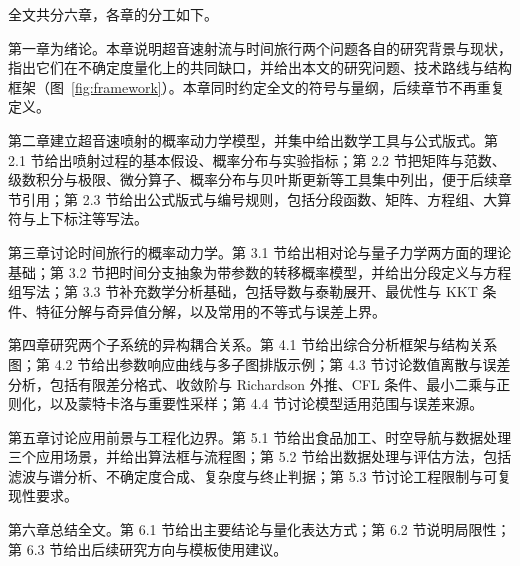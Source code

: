 全文共分六章，各章的分工如下。

第一章为绪论。本章说明超音速射流与时间旅行两个问题各自的研究背景与现状，指出它们在不确定度量化上的共同缺口，并给出本文的研究问题、技术路线与结构框架（图~\ref{fig:framework}）。本章同时约定全文的符号与量纲，后续章节不再重复定义。

第二章建立超音速喷射的概率动力学模型，并集中给出数学工具与公式版式。第 2.1 节给出喷射过程的基本假设、概率分布与实验指标；第 2.2 节把矩阵与范数、级数积分与极限、微分算子、概率分布与贝叶斯更新等工具集中列出，便于后续章节引用；第 2.3 节给出公式版式与编号规则，包括分段函数、矩阵、方程组、大算符与上下标注等写法。

第三章讨论时间旅行的概率动力学。第 3.1 节给出相对论与量子力学两方面的理论基础；第 3.2 节把时间分支抽象为带参数的转移概率模型，并给出分段定义与方程组写法；第 3.3 节补充数学分析基础，包括导数与泰勒展开、最优性与 KKT 条件、特征分解与奇异值分解，以及常用的不等式与误差上界。

第四章研究两个子系统的异构耦合关系。第 4.1 节给出综合分析框架与结构关系图；第 4.2 节给出参数响应曲线与多子图排版示例；第 4.3 节讨论数值离散与误差分析，包括有限差分格式、收敛阶与 Richardson 外推、CFL 条件、最小二乘与正则化，以及蒙特卡洛与重要性采样；第 4.4 节讨论模型适用范围与误差来源。

第五章讨论应用前景与工程化边界。第 5.1 节给出食品加工、时空导航与数据处理三个应用场景，并给出算法框与流程图；第 5.2 节给出数据处理与评估方法，包括滤波与谱分析、不确定度合成、复杂度与终止判据；第 5.3 节讨论工程限制与可复现性要求。

第六章总结全文。第 6.1 节给出主要结论与量化表达方式；第 6.2 节说明局限性；第 6.3 节给出后续研究方向与模板使用建议。
